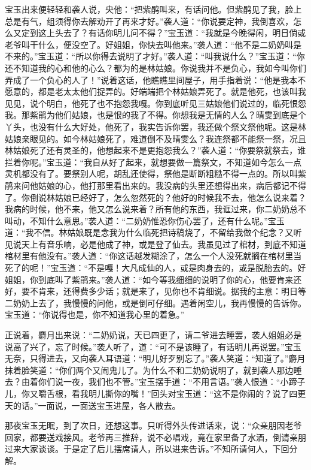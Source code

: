 \begin{parag}
    宝玉出来便轻轻和袭人说，央他：“把紫鹃叫来，有话问他。但紫鹃见了我，脸上总是有气，组须得你去解劝开了再来才好。”袭人道：“你说要定神，我倒喜欢，怎么又定到这上头去了？有话你明儿问不得？”宝玉道：“我就是今晚得闲，明日倘或老爷叫干什么，便没空了。好姐姐，你快去叫他来。”袭人道：“他不是二奶奶叫是不来的。”宝玉道：“所以你得去说明了才好。”袭人道：“叫我说什么？”宝玉道：“你还不知道我的心和他的心么？都为的是林姑娘。你说我并不是负心，我如今叫你们弄成了一个负心的人了！”说着这话，他瞧瞧里间屋子，用手指着说：“他是我本不愿意的，都是老太太他们捉弄的。好端端把个林姑娘弄死了。就是他死，也该叫我见见，说个明白，他死了也不抱怨我嘎。你到底听见三姑娘他们说过的，临死恨怨我。那紫鹃为他们姑娘，也是恨的我了不得。你想我是无情的人么？晴雯到底是个丫头，也没有什么大好处，他死了，我实告诉你罢，我还做个祭文祭他呢。这是林姑娘亲眼见的。如今林姑娘死了，难道倒不及晴雯么？我连祭都不能祭一祭，况且林姑娘死了还有灵圣的，他想起来不是更抱怨我么？”袭人道：“你要祭就祭去，谁拦着你呢。”宝玉道：“我自从好了起来，就想要做一篇祭文，不知道如今怎么一点灵机都没有了。要祭别人呢，胡乱还使得，祭他是断断粗糙不得一点的。所以叫紫鹃来问他姑娘的心，他打那里看出来的。我没病的头里还想得出来，病后都记不得了。你倒说林姑娘已经好了，怎么忽然死的？他好的时候我不去，他怎么说来着？我病的时候，他不来，他又怎么说来着？所有他的东西，我诓过来，你二奶奶总不叫动，不知什么意思。”袭人道：“二奶奶惟恐你伤心罢了，还有什么呢。”宝玉道：“我不信。林姑娘既是念我为什么临死把诗稿烧了，不留给我做个纪念？又听见说天上有音乐响，必是他成了神，或是登了仙去。我虽见过了棺材，到底不知道棺材里有他没有。”袭人道：“你这话越发糊涂了，怎么一个人没死就搁在棺材里当死了的呢！”宝玉道：“不是嘎！大凡成仙的人，或是肉身去的，或是脱胎去的。好姐姐，你到底叫了紫鹃来。”袭人道：“如今等我细细的说明了你的心，他要肯来还好，要不肯来，还得费多少话；就是来了，见你也不肯细说。据我的主意：明日等二奶奶上去了，我慢慢的问他，或是倒可仔细。遇着闲空儿，我再慢慢的告诉你。宝玉道：“你说得也是，你不知道我心里的着急。”
\end{parag}


\begin{parag}
    正说着，麝月出来说：“二奶奶说，天已四更了，请二爷进去睡罢，袭人姐姐必是说高了兴了，忘了时候。”袭人听了，道：“可不是该睡了，有话明儿再说罢。”宝玉无奈，只得进去，又向袭人耳语道：“明儿好歹别忘了。”袭人笑道：“知道了。”麝月抹着脸笑道：“你们两个又闹鬼儿了。为什么不和二奶奶说明了，就到袭人那边睡去？由着你们说一夜，我们也不管。”宝玉摆手道：“不用言语。”袭人恨道：“小蹄子儿，你又嚼舌根，看我明儿撕你的嘴！”回头对宝玉道：“这不是你闹的？说了四更天的话。”一面说，一面送宝玉进屋，各人散去。
\end{parag}


\begin{parag}
    那夜宝玉无眠，到了次日，还想这事。只听得外头传进话来，说：“众亲朋因老爷回家，都要送戏接风。老爷再三推辞，说不必唱戏，竟在家里备了水酒，倒请亲朋过来大家谈谈。于是定了后儿摆席请人，所以进来告诉。”不知所请何人，下回分解。
\end{parag}